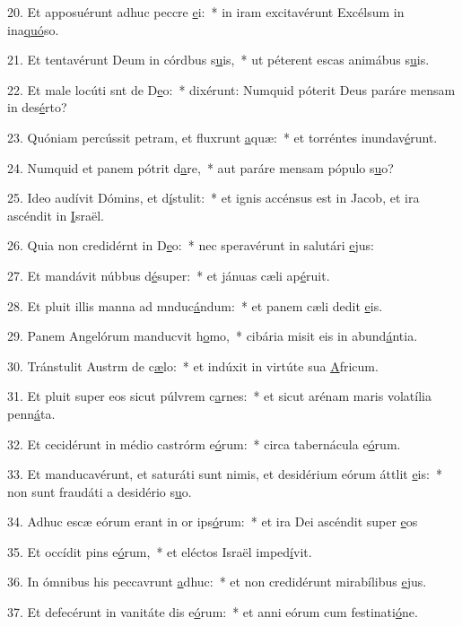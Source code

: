 20. Et apposuérunt adhuc peccre \uline{e}i:~* in iram excitavérunt Excélsum in ina\uline{quó}so.\par 
21. Et tentavérunt Deum in córdbus s\uline{u}is,~* ut péterent escas animábus s\uline{u}is.\par 
22. Et male locúti snt de D\uline{e}o:~* dixérunt: Numquid póterit Deus paráre mensam in des\uline{é}rto?\par 
23. Quóniam percússit petram, et fluxrunt \uline{a}quæ:~* et torréntes inundav\uline{é}runt.\par 
24. Numquid et panem pótrit d\uline{a}re,~* aut paráre mensam pópulo s\uline{u}o?\par 
25. Ideo audívit Dómins, et d\uline{í}stulit:~* et ignis accénsus est in Jacob, et ira ascéndit in \uline{I}sraël.\par 
26. Quia non credidérnt in D\uline{e}o:~* nec speravérunt in salutári \uline{e}jus:\par 
27. Et mandávit núbbus d\uline{é}super:~* et jánuas cæli ap\uline{é}ruit.\par 
28. Et pluit illis manna ad mnduc\uline{á}ndum:~* et panem cæli dedit \uline{e}is.\par 
29. Panem Angelórum manducvit h\uline{o}mo,~* cibária misit eis in abund\uline{á}ntia.\par 
30. Tránstulit Austrm de c\uline{æ}lo:~* et indúxit in virtúte sua \uline{A}fricum.\par 
31. Et pluit super eos sicut púlvrem c\uline{a}rnes:~* et sicut arénam maris volatília penn\uline{á}ta.\par 
32. Et cecidérunt in médio castrórm e\uline{ó}rum:~* circa tabernácula e\uline{ó}rum.\par 
33. Et manducavérunt, et saturáti sunt nimis, et desidérium eórum áttlit \uline{e}is:~* non sunt fraudáti a desidério s\uline{u}o.\par 
34. Adhuc escæ eórum erant in or ips\uline{ó}rum:~* et ira Dei ascéndit super \uline{e}os\par 
35. Et occídit pins e\uline{ó}rum,~* et eléctos Israël imped\uline{í}vit.\par 
36. In ómnibus his peccavrunt \uline{a}dhuc:~* et non credidérunt mirabílibus \uline{e}jus.\par 
37. Et defecérunt in vanitáte dis e\uline{ó}rum:~* et anni eórum cum festinati\uline{ó}ne.\par 
